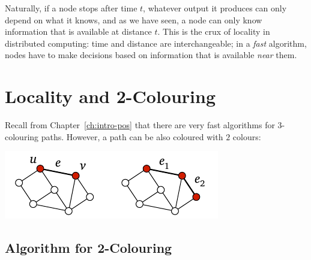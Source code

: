 Naturally, if a node stops after time $t$, whatever output it produces can only depend on what it knows, and as we have seen, a node can only know information that is available at distance $t$. This is the crux of locality in distributed computing: time and distance are interchangeable; in a \emph{fast} algorithm, nodes have to make decisions based on information that is available \emph{near} them.


\section{Locality and 2-Colouring}\label{sec:intro-neg-simple}

Recall from Chapter~\ref{ch:intro-pos} that there are very fast algorithms for $3$-colouring paths. However, a path can be also coloured with $2$ colours:
\begin{center}
    \includegraphics[page=\PIntroColTwo]{figs.pdf}
\end{center}


\subsection{Algorithm for 2-Colouring}

